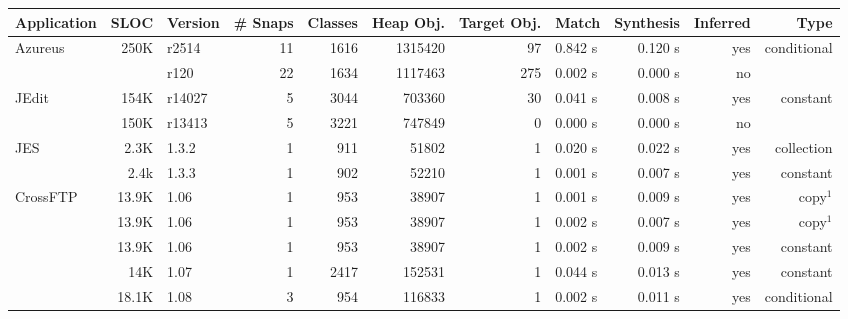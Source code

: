 \newcommand{\Y}{yes}
\newcommand{\N}{no}

\begin{table*}[t]
\begin{small}
\begin{center}
\begin{threeparttable}
\begin{tabular}{@{}lrlrrrrlrrr@{}} 
\textsf{\textbf{Application}}     & \textsf{\textbf{SLOC}}     & 
\textsf{\textbf{Version}} & \textsf{\textbf{\# Snaps}} &
  \textsf{\textbf{Classes}} & \textsf{\textbf{Heap Obj.}} & \textsf{\textbf{Target Obj.}} & 
  \textsf{\textbf{Match}} & \textsf{\textbf{Synthesis}} & \textsf{\textbf{Inferred}}   & \textsf{\textbf{Type}} \\ \hline

Azureus         & 250K      & r2514  & 11 &
  1616 & 1315420 & 97 & 
  0.842 s & 0.120 s & \Y  &  conditional \\

                &          & r120        & 22 &
  1634 & 1117463 & 275 & 
  0.002 s & 0.000 s & \N &          \\ \hline

JEdit           & 154K  & r14027  & 5 &
  3044 & 703360 & 30 & 
  0.041 s & 0.008 s & \Y &  constant \\


                & 150K  & r13413  & 5 &
  3221 & 747849 & 0 & 
  0.000 s & 0.000 s & \N &   \\ \hline

JES & 2.3K    & 1.3.2   & 1 &
  911 & 51802 & 1 &
  0.020 s & 0.022 s & \Y & collection \\

 & 2.4k & 1.3.3 & 1 & 902 & 52210 & 1
 & 0.001 s & 0.007 s & \Y & constant \\
 \hline


CrossFTP & 13.9K & 1.06 & 1 & 953 & 38907 & 1 & 0.001 s & 0.009 s & \Y & copy$^1$ \\
& 13.9K & 1.06 & 1 &  953 &  38907 & 1 & 0.002 s & 0.007 s & \Y & copy$^1$ \\
& 13.9K & 1.06 & 1 &  953 &  38907 & 1 & 0.002 s & 0.009 s & \Y & constant \\
& 14K & 1.07 & 1 & 2417 & 152531 & 1 & 0.044 s & 0.013 s & \Y & constant \\
& 18.1K & 1.08 & 3 &  954 & 116833 & 1 & 0.002 s & 0.011 s & \Y & conditional \\


\end{tabular}
\end{threeparttable}
\end{center}
\end{small}
\end{table*}
